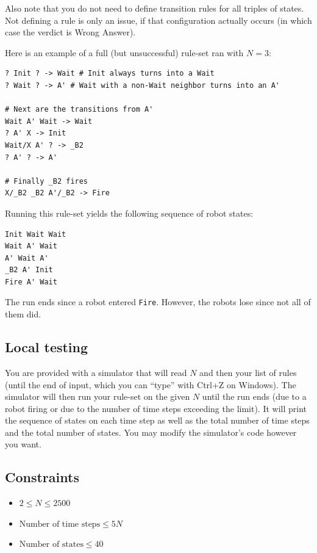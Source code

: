 \documentclass[12pt]{article}
\begin{document}
Also note that you do not need to define transition rules for all triples of states. Not defining a rule is only an issue, if that configuration actually occurs (in which case the verdict is Wrong Answer).

Here is an example of a full (but unsuccessful) rule-set ran with $N=3$:

\begin{verbatim}
? Init ? -> Wait # Init always turns into a Wait
? Wait ? -> A' # Wait with a non-Wait neighbor turns into an A'

# Next are the transitions from A'
Wait A' Wait -> Wait
? A' X -> Init
Wait/X A' ? -> _B2
? A' ? -> A'

# Finally _B2 fires
X/_B2 _B2 A'/_B2 -> Fire
\end{verbatim}

Running this rule-set yields the following sequence of robot states:

\begin{verbatim}
Init Wait Wait
Wait A' Wait
A' Wait A'
_B2 A' Init
Fire A' Wait
\end{verbatim}

The run ends since a robot entered \verb|Fire|. However, the robots lose since not all of them did.

\subsection{Local testing}

You are provided with a simulator that will read $N$ and then your list of rules (until the end of input, which you can ``type'' with Ctrl+Z on Windows). The simulator will then run your rule-set on the given $N$ until the run ends (due to a robot firing or due to the number of time steps exceeding the limit). It will print the sequence of states on each time step as well as the total number of time steps and the total number of states. You may modify the simulator's code however you want.

\subsection{Constraints}
\vspace{0.1em}

\begin{itemize}
\item $2 \leq N \leq 2500$
\item $\textrm{Number of time steps} \leq 5N$
\item $\textrm{Number of states} \leq 40$
\end{itemize}
\end{document}
